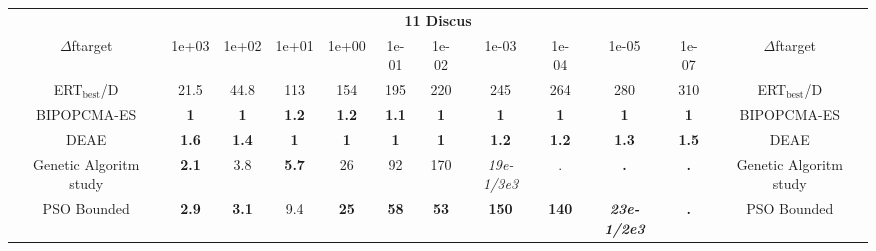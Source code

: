 \begin{tabular}{cccccccccccc}
 & \multicolumn{10}{c}{{\normalsize \textbf{11 Discus}}}\\
$\Delta$ftarget& 1e+03& 1e+02& 1e+01& 1e+00& 1e-01& 1e-02& 1e-03& 1e-04& 1e-05& 1e-07 & $\Delta$ftarget \\
ERT$_{\textrm{best}}$/D& 21.5& 44.8& 113& 154& 195& 220& 245& 264& 280& 310 & ERT$_{\textrm{best}}$/D \\
\hline
BIPOPCMA-ES & \textbf{1} & \textbf{1} & \textbf{1.2} & \textbf{1.2} & \textbf{1.1} & \textbf{1} & \textbf{1} & \textbf{1} & \textbf{1} & \textbf{1} & BIPOPCMA-ES \cite{add_an_entry_for_BIPOPCMA-ES_in_bbob.bib}\\
DEAE & \textbf{1.6} & \textbf{1.4} & \textbf{1} & \textbf{1} & \textbf{1} & \textbf{1} & \textbf{1.2} & \textbf{1.2} & \textbf{1.3} & \textbf{1.5} & DEAE \cite{add_an_entry_for_DEAE_in_bbob.bib}\\
Genetic Algoritm study & \textbf{2.1} & 3.8 & \textbf{5.7} & 26 & 92 & 170 & \textit{19e-1}\textit{/3e3} & . & \textbf{.} & \textbf{.} & Genetic Algoritm study \cite{add_an_entry_for_Genetic Algoritm study_in_bbob.bib}\\
PSO Bounded & \textbf{2.9} & \textbf{3.1} & 9.4 & \textbf{25} & \textbf{58} & \textbf{53} & \textbf{150} & \textbf{140} & \textbf{\textit{23e-1}\textit{/2e3}} & \textbf{.} & PSO Bounded \cite{add_an_entry_for_PSO Bounded_in_bbob.bib}
\end{tabular}

